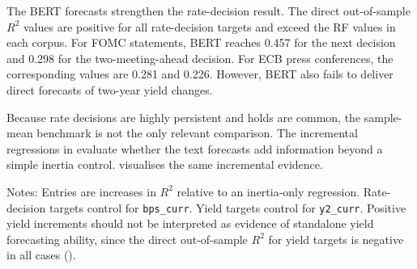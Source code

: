 The BERT forecasts strengthen the rate-decision result. The direct
out-of-sample $R^2$ values are positive for all rate-decision targets and
exceed the RF values in each corpus. For FOMC statements, BERT reaches
0.457 for the next decision and 0.298 for the two-meeting-ahead decision. For
ECB press conferences, the corresponding values are 0.281 and 0.226. However,
BERT also fails to deliver direct forecasts of two-year yield changes.

Because rate decisions are highly persistent and holds are common, the
sample-mean benchmark is not the only relevant comparison. The incremental
regressions in  evaluate whether the text
forecasts add information beyond a simple inertia control.
 visualises the same incremental evidence.

\begin{table}[H]
\centering
\caption{Incremental $R^2$ of text forecasts beyond inertia}
\label{tab:rq2_incremental_v31}
\begin{threeparttable}
\small
{}
\begin{tablenotes}
\footnotesize
\item Notes: Entries are increases in $R^2$ relative to an inertia-only regression. Rate-decision targets control for \texttt{bps\_curr}. Yield targets control for \texttt{y2\_curr}. Positive yield increments should not be interpreted as evidence of standalone yield forecasting ability, since the direct out-of-sample $R^2$ for yield targets is negative in all cases ().
\end{tablenotes}
\end{threeparttable}
\end{table}


